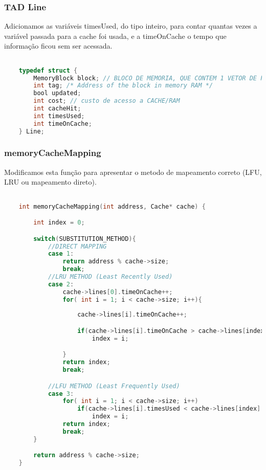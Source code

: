 \documentclass{article}
\begin{document}
\subsubsection{TAD Line}

Adicionamos as variáveis timesUsed, do tipo inteiro, para contar quantas vezes a variável passada para a cache foi usada, e a timeOnCache o tempo que informação ficou sem ser acessada.

\begin{lstlisting}[caption={TAD Line},label={lst:cod6},language=C]

    typedef struct {
        MemoryBlock block; // BLOCO DE MEMORIA, QUE CONTEM 1 VETOR DE PALAVRAS, O BLOCO REPRESENTA CACHE L1 L2 L3 E RAM
        int tag; /* Address of the block in memory RAM */
        bool updated;
        int cost; // custo de acesso a CACHE/RAM
        int cacheHit;
        int timesUsed;
        int timeOnCache;
    } Line;

\end{lstlisting}

\subsubsection{memoryCacheMapping}

Modificamos esta função para apresentar o metodo de mapeamento correto (LFU, LRU ou mapeamento direto).

\begin{lstlisting}[caption={Função memoryCacheMapping},label={lst:cod6},language=C]

    int memoryCacheMapping(int address, Cache* cache) {

        int index = 0;

        switch(SUBSTITUTION_METHOD){
            //DIRECT MAPPING
            case 1:
                return address % cache->size;
                break;
            //LRU METHOD (Least Recently Used)
            case 2:
                cache->lines[0].timeOnCache++;
                for( int i = 1; i < cache->size; i++){
                    
                    cache->lines[i].timeOnCache++;

                    if(cache->lines[i].timeOnCache > cache->lines[index].timeOnCache)
                        index = i;

                }
                return index;
                break;

            //LFU METHOD (Least Frequently Used)
            case 3:
                for( int i = 1; i < cache->size; i++)
                    if(cache->lines[i].timesUsed < cache->lines[index].timesUsed)
                        index = i;
                return index;
                break;
        }

        return address % cache->size;
    }

\end{lstlisting}
\end{document}
